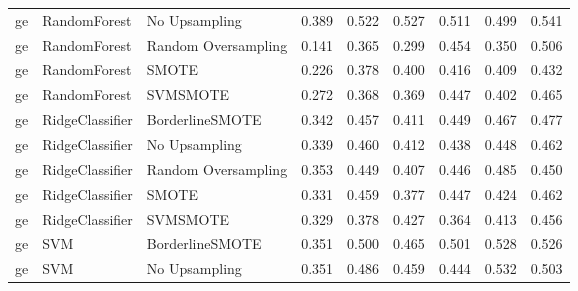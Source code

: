 \begin{tabular}{lllllllll}
      ge &                 RandomForest &       No Upsampling & 0.389 &                     0.522 &                 0.527 &                  0.511 &                                   0.499 &     0.541 \\
      ge &                 RandomForest & Random Oversampling & 0.141 &                     0.365 &                 0.299 &                  0.454 &                                   0.350 &     0.506 \\
      ge &                 RandomForest &               SMOTE & 0.226 &                     0.378 &                 0.400 &                  0.416 &                                   0.409 &     0.432 \\
      ge &                 RandomForest &            SVMSMOTE & 0.272 &                     0.368 &                 0.369 &                  0.447 &                                   0.402 &     0.465 \\
      ge &              RidgeClassifier &     BorderlineSMOTE & 0.342 &                     0.457 &                 0.411 &                  0.449 &                                   0.467 &     0.477 \\
      ge &              RidgeClassifier &       No Upsampling & 0.339 &                     0.460 &                 0.412 &                  0.438 &                                   0.448 &     0.462 \\
      ge &              RidgeClassifier & Random Oversampling & 0.353 &                     0.449 &                 0.407 &                  0.446 &                                   0.485 &     0.450 \\
      ge &              RidgeClassifier &               SMOTE & 0.331 &                     0.459 &                 0.377 &                  0.447 &                                   0.424 &     0.462 \\
      ge &              RidgeClassifier &            SVMSMOTE & 0.329 &                     0.378 &                 0.427 &                  0.364 &                                   0.413 &     0.456 \\
      ge &                          SVM &     BorderlineSMOTE & 0.351 &                     0.500 &                 0.465 &                  0.501 &                                   0.528 &     0.526 \\
      ge &                          SVM &       No Upsampling & 0.351 &                     0.486 &                 0.459 &                  0.444 &                                   0.532 &     0.503 \\

\end{tabular}
